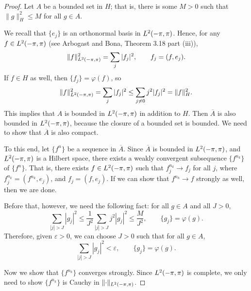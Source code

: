 \documentclass{homework}
\begin{document}
\begin{arabicparts}
		\begin{proof}
			Let $A$ be a bounded set in $H$; that is, there is some $M > 0$ such that $\lVert g \rVert_H^2\le M$ for all $g \in A$.
			
			We recall that $\{e_j\}$ is an orthonormal basis in ${L^2(-\pi,\pi)}$. Hence, for any $f \in {L^2(-\pi,\pi)}$ (see Arbogast and Bona, Theorem 3.18 part (iii)),
			\begin{equation}
				\lVert f\rVert_{L^2(-\pi,\pi)}^2 = \sum_{j} |f_j|^2, \qquad f_j = (f,e_j).
			\end{equation}
			If $f \in H$ as well, then $\{f_j\} = \varphi(f)$, so
			\begin{equation}
				\lVert f\rVert_{L^2(-\pi,\pi)}^2 = \sum_{j}|f_j|^2 \le \sum_{j\ne 0}j^2|f_j|^2 = \lVert f\rVert_H^2.
			\end{equation}
			This implies that $A$ is bounded in ${L^2(-\pi,\pi)}$ in addition to $H$. Then $\overline{A}$ is also bounded in ${L^2(-\pi,\pi)}$, because the closure of a bounded set is bounded. We need to show that $\overline{A}$ is also compact.
			
			To this end, let $\{f^n\}$ be a sequence in $\overline{A}$. Since $\overline{A}$ is bounded in ${L^2(-\pi,\pi)}$, and ${L^2(-\pi,\pi)}$ is a Hilbert space, there exists a weakly convergent subsequence $\{f^{n_k}\}$ of $\{f^n\}$. That is, there exists $f \in {L^2(-\pi,\pi)}$ such that $f^{n_k}_j \to f_j$ for all $j$, where $f^{n_k}_j = (f^{n_k},e_j)$, and $f_j = (f,e_j)$. If we can show that $f^{n_k}\to f$ strongly as well, then we are done.
			
			Before that, however, we need the following fact: for all $g \in A$ and all $J > 0$,
			\begin{equation}
				\sum_{|j|> J} |g_j|^2 \le \frac{1}{J^2}\sum_{|j| > J}j^2|g_j|^2 \le \frac{M}{J^2}, \qquad \{g_j\} = \varphi(g).
			\end{equation}
			Therefore, given $\varepsilon > 0$, we can choose $J > 0$ such that for all $g \in A$,
			\begin{equation}
				\label{eq:uniform_tails}
				\sum_{|j| > J}|g_j|^2 < \varepsilon, \qquad \{g_j\}=\varphi(g).
			\end{equation}
			
			Now we show that $\{f^{n_k}\}$ converges strongly. Since ${L^2(-\pi,\pi)}$ is complete, we only need to show $\{f^{n_k}\}$ is Cauchy in $\lVert\cdot\rVert_{L^2(-\pi,\pi)}$.
			

\end{proof}
\end{arabicparts}
\end{document}
